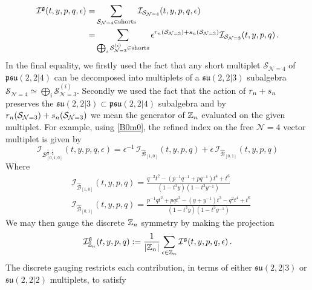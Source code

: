 \documentclass[main.tex]{subfiles}
\begin{document}
\begin{equation}\label{eqn:epsilonpres}
\begin{aligned}
\mathcal{I}^{\mathfrak{g}}(t,y,p,q,\epsilon) =&
\sum_{\mathcal{S}_{\mathcal{N}=4} \in \text{shorts}} \mathcal{I}_{\mathcal{S}_{\mathcal{N}=4}}(t,y,p,q,\epsilon)\\
=&\sum_{\bigoplus_i \mathcal{S}^{(i)}_{\mathcal{N}=3} \in \text{shorts}} \epsilon^{r_{n}\left(\mathcal{S}_{\mathcal{N}=3}\right)+ s_{n}\left(\mathcal{S}_{\mathcal{N}=3}\right)}\mathcal{I}_{\mathcal{S}_{\mathcal{N}=3}}(t,y,p,q)\,.
\end{aligned}
\end{equation}
In the final equality, we firstly used the fact that any short multiplet $\mathcal{S}_{\mathcal{N}=4}$ of $\mathfrak{psu}(2,2|4)$ can be decomposed into multiplets of a $\mathfrak{su}(2,2|3)$ subalgebra $\mathcal{S}_{\mathcal{N}=4}\simeq\bigoplus_i\mathcal{S}^{(i)}_{\mathcal{N}=3}$. Secondly we used the fact that the action of $r_{n}+ s_{n}$ preserves the $\mathfrak{su}(2,2|3)\subset\mathfrak{psu}(2,2|4)$ subalgebra and by $r_{n}(\mathcal{S}_{\mathcal{N}=3})+ s_{n}(\mathcal{S}_{\mathcal{N}=3})$ we mean the generator of $\mathbb{Z}_{n}$ evaluated on the given multiplet. For example, using \eqref{B0m0}, the refined index on the free $\mathcal{N}=4$ vector multiplet is given by
\begin{equation}\label{eqn:ik}
\mathcal{I}_{\mathcal{B}_{[0,1,0]}^{\frac{1}{2},\frac{1}{2}}}(t,y,p,q,\epsilon)=\epsilon^{-1}\,\mathcal{I}_{\hat{\mathcal{B}}_{[1,0]}}(t,y,p,q)+\epsilon\,\mathcal{I}_{\hat{\mathcal{B}}_{[0,1]}}(t,y,p,q)
\end{equation}
Where
\begin{align}
&\mathcal{I}_{\hat{\mathcal{B}}_{[1,0]}}(t,y,p,q)=\frac{q^{-2}t^2-\left(p^{-1}q^{-1}+pq^{-1}\right)t^4+t^6}{(1-t^3y)(1-t^3y^{-1})}\\
&\mathcal{I}_{\hat{\mathcal{B}}_{[0,1]}}(t,y,p,q)=\frac{p^{-1}qt^2+pqt^2-(y+y^{-1})t^3-q^2t^4+t^6}{(1-t^3y)(1-t^3y^{-1})}
\end{align}
We may then gauge the discrete $\mathbb{Z}_{n}$ symmetry by making the projection
\begin{equation}\label{eqn:discgaugepro}
\mathcal{I}_{\mathbb{Z}_{n}}^{\mathfrak{g}}(t,y,p,q):=\frac{1}{|\mathbb{Z}_{n}|}\sum_{\epsilon\in\mathbb{Z}_{n}}\mathcal{I}^{\mathfrak{g}}(t,y,p,q,\epsilon) \, .
\end{equation} 
The discrete gauging restricts each contribution, in terms of either $\mathfrak{su}(2,2|3)$ or $\mathfrak{su}(2,2|2)$ multiplets, to satisfy
\end{document}
